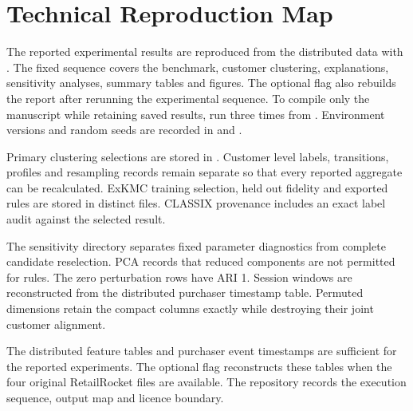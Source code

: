 \chapter{Technical Reproduction Map}

The reported experimental results are reproduced from the distributed data with . The fixed sequence covers the benchmark, customer clustering, explanations, sensitivity analyses, summary tables and figures. The optional  flag also rebuilds the report after rerunning the experimental sequence. To compile only the manuscript while retaining saved results, run  three times from . Environment versions and random seeds are recorded in  and .

Primary clustering selections are stored in . Customer level labels, transitions, profiles and resampling records remain separate so that every reported aggregate can be recalculated. ExKMC training selection, held out fidelity and exported rules are stored in distinct files. CLASSIX provenance includes an exact label audit against the selected result.

The sensitivity directory separates fixed parameter diagnostics from complete candidate reselection. PCA records that reduced components are not permitted for rules. The zero perturbation rows have ARI 1. Session windows are reconstructed from the distributed purchaser timestamp table. Permuted dimensions retain the compact columns exactly while destroying their joint customer alignment.

The distributed feature tables and purchaser event timestamps are sufficient for the reported experiments. The optional  flag reconstructs these tables when the four original RetailRocket files are available. The repository  records the execution sequence, output map and licence boundary.
